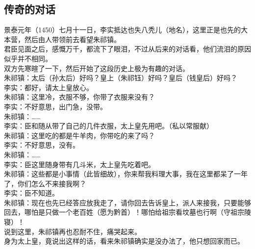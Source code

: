 \begin{multicols}{\theparacolNo}
\subsection{传奇的对话}
景泰元年（1450）七月十一日，李实抵达也失八秃儿（地名），这里正是也先的大本营，然后由人带领前去看望朱祁镇。\\

君臣见面之后，感慨万千，都流下了眼泪，不过从后来的对话看，他们流泪的原因似乎并不相同。\\

双方先寒暄了一下，然后开始了这段历史上极为有趣的对话。\\

朱祁镇：太后（孙太后）好吗？皇上（朱祁钰）好吗？皇后（钱皇后）好吗？\\

李实：都好，请太上皇放心。\\

朱祁镇：这里冷，衣服不够，你带了衣服来没有？\\

李实：不好意思，出门急，没带。\\

朱祁镇：……\\

李实：臣和随从带了自己的几件衣服，太上皇先用吧。（私以常服献）\\

朱祁镇：这里吃的都是牛羊肉，你带吃的来了吗？\\

李实：不好意思，没有。\\

朱祁镇：……\\

李实：臣这里随身带有几斗米，太上皇先吃着吧。\\

朱祁镇：这些都是小事情（此皆细故），你来帮我料理大事，我在这里都呆了一年了，你们怎么不来接我啊？\\

李实：臣不知道。\\

朱祁镇：现在也先已经答应放我走了，请你回去告诉皇上，派人来接我，只要能够回去，哪怕是只做一个老百姓（愿为黔首）！哪怕给祖宗看坟墓也行啊（守祖宗陵寝）！\\

说到这里，朱祁镇再也忍耐不住，痛哭起来。\\

身为太上皇，竟说出这样的话，看来朱祁镇确实是没办法了，他只想回家而已。\\


\end{multicols}
